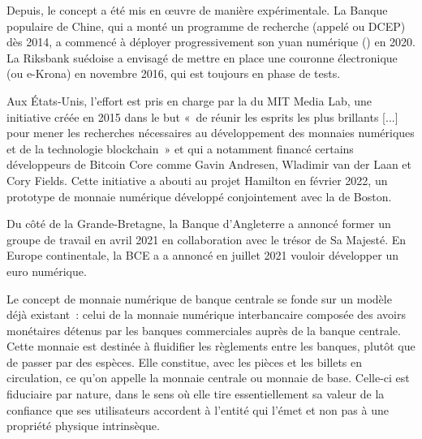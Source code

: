 Depuis, le concept a été mis en œuvre de manière expérimentale. La Banque populaire de Chine, qui a monté un programme de recherche (appelé  ou DCEP) dès 2014, a commencé à déployer progressivement son yuan numérique () en 2020. La Riksbank suédoise a envisagé de mettre en place une couronne électronique (ou e-Krona) en novembre 2016, qui est toujours en phase de tests.

Aux États-Unis, l'effort est pris en charge par la  du MIT Media Lab, une initiative créée en 2015 dans le but «~de réunir les esprits les plus brillants [...] pour mener les recherches nécessaires au développement des monnaies numériques et de la technologie blockchain~» et qui a notamment financé certains développeurs de Bitcoin Core comme Gavin Andresen, Wladimir van der Laan et Cory Fields. Cette initiative a abouti au projet Hamilton en février 2022, un prototype de monnaie numérique développé conjointement avec la  de Boston.

Du côté de la Grande-Bretagne, la Banque d'Angleterre a annoncé former un groupe de travail en avril 2021 en collaboration avec le trésor de Sa Majesté. En Europe continentale, la BCE a a annoncé en juillet 2021 vouloir développer un euro numérique.


Le concept de monnaie numérique de banque centrale se fonde sur un modèle déjà existant~: celui de la monnaie numérique interbancaire composée des avoirs monétaires détenus par les banques commerciales auprès de la banque centrale. Cette monnaie est destinée à fluidifier les règlements entre les banques, plutôt que de passer par des espèces. Elle constitue, avec les pièces et les billets en circulation, ce qu'on appelle la monnaie centrale ou monnaie de base. Celle-ci est fiduciaire par nature, dans le sens où elle tire essentiellement sa valeur de la confiance que ses utilisateurs accordent à l'entité qui l'émet et non pas à une propriété physique intrinsèque.

